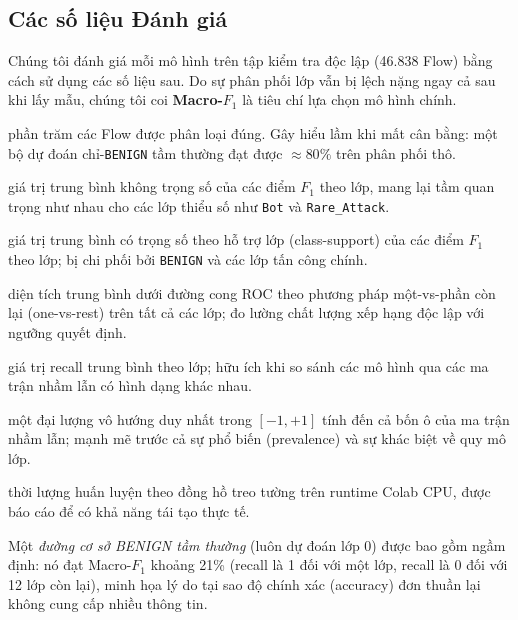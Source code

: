 \subsection{Các số liệu Đánh giá}
\label{sec:exp-metrics}

Chúng tôi đánh giá mỗi mô hình trên tập kiểm tra độc lập (46.838 Flow) bằng cách sử dụng các số liệu sau. Do sự phân phối lớp vẫn bị lệch nặng ngay cả sau khi lấy mẫu, chúng tôi coi \textbf{Macro-$F_1$} là tiêu chí lựa chọn mô hình chính.

\begin{description}[leftmargin=1.2em,itemsep=2pt,topsep=2pt]
    \item[Accuracy (Độ chính xác)] phần trăm các Flow được phân loại đúng. Gây hiểu lầm khi mất cân bằng: một bộ dự đoán chỉ-\texttt{BENIGN} tầm thường đạt được ${\approx}80\%$ trên phân phối thô.
    \item[Macro-$F_1$] giá trị trung bình không trọng số của các điểm $F_1$ theo lớp, mang lại tầm quan trọng như nhau cho các lớp thiểu số như \texttt{Bot} và \texttt{Rare\_Attack}.
    \item[Weighted-$F_1$] giá trị trung bình có trọng số theo hỗ trợ lớp (class-support) của các điểm $F_1$ theo lớp; bị chi phối bởi \texttt{BENIGN} và các lớp tấn công chính.
    \item[ROC-AUC (macro OvR)] diện tích trung bình dưới đường cong ROC theo phương pháp một-vs-phần còn lại (one-vs-rest) trên tất cả các lớp; đo lường chất lượng xếp hạng độc lập với ngưỡng quyết định.
    \item[Balanced Accuracy (Độ chính xác Cân bằng)] giá trị recall trung bình theo lớp; hữu ích khi so sánh các mô hình qua các ma trận nhầm lẫn có hình dạng khác nhau.
    \item[Hệ số Tương quan Matthews (MCC)] một đại lượng vô hướng duy nhất trong $[-1, +1]$ tính đến cả bốn ô của ma trận nhầm lẫn; mạnh mẽ trước cả sự phổ biến (prevalence) và sự khác biệt về quy mô lớp.
    \item[Training time (Thời gian huấn luyện)] thời lượng huấn luyện theo đồng hồ treo tường trên runtime Colab CPU, được báo cáo để có khả năng tái tạo thực tế.
\end{description}

\noindent Một \emph{đường cơ sở BENIGN tầm thường} (luôn dự đoán lớp 0) được bao gồm ngầm định: nó đạt Macro-$F_1$ khoảng 21\% (recall là 1 đối với một lớp, recall là 0 đối với 12 lớp còn lại), minh họa lý do tại sao độ chính xác (accuracy) đơn thuần lại không cung cấp nhiều thông tin.
